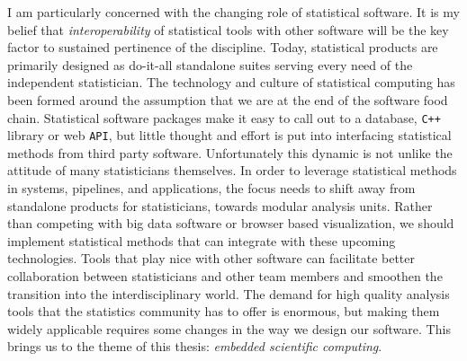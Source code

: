 I am particularly concerned with the changing role of statistical software. It is my belief that \emph{interoperability} of statistical tools with other software will be the key factor to sustained pertinence of the discipline. Today, statistical products are primarily designed as do-it-all standalone suites serving every need of the independent statistician. The technology and culture of statistical computing has been formed around the assumption that we are at the end of the software food chain. Statistical software packages make it easy to call out to a database, \texttt{C++} library or web \texttt{API}, but little thought and effort is put into interfacing statistical methods from third party software. Unfortunately this dynamic is not unlike the attitude of many statisticians themselves. In order to leverage statistical methods in systems, pipelines, and applications, the focus needs to shift away from standalone products for statisticians, towards modular analysis units. Rather than competing with big data software or browser based visualization, we should implement statistical methods that can integrate with these upcoming technologies. Tools that play nice with other software can facilitate better collaboration between statisticians and other team members and smoothen the transition into the interdisciplinary world. The demand for high quality analysis tools that the statistics community has to offer is enormous, but making them widely applicable requires some changes in the way we design our software. This brings us to the theme of this thesis: \emph{embedded scientific computing}. 





